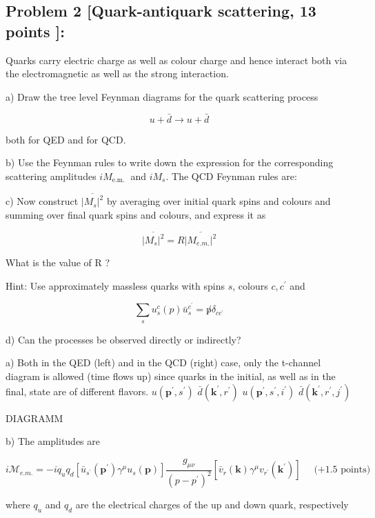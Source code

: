 \documentclass[10pt, letterpaper]{article}
\begin{document}
\subsection{Problem 2 [Quark-antiquark scattering, 13 points ]:}
Quarks carry electric charge as well as colour charge and hence interact both via the electromagnetic as well as the strong interaction.

a) Draw the tree level Feynman diagrams for the quark scattering process

$$
u+\bar{d} \rightarrow u+\bar{d}
$$

both for QED and for QCD.

b) Use the Feynman rules to write down the expression for the corresponding scattering amplitudes $i M_{\text {e.m. }}$ and $i M_s$. The QCD Feynman rules are:

c) Now construct $\overline{\left|M_s\right|^2}$ by averaging over initial quark spins and colours and summing over final quark spins and colours, and express it as

$$
\overline{\left|M_s\right|^2}=R \overline{\left|M_{e . m .}\right|^2}
$$

What is the value of R ?

Hint: Use approximately massless quarks with spins $s$, colours $c, c^{\prime}$ and

$$
\sum_s u_s^c(p) \bar{u}_s^{c^{\prime}}=\not p \delta_{c c^{\prime}}
$$

d) Can the processes be observed directly or indirectly?



a) Both in the QED (left) and in the QCD (right) case, only the t-channel diagram is allowed (time flows up) since quarks in the initial, as well as in the final, state are of different flavors.
$u\left(\mathbf{p}^{\prime}, s^{\prime}\right)$
$\bar{d}\left(\mathbf{k}^{\prime}, r^{\prime}\right)$
$u\left(\mathbf{p}^{\prime}, s^{\prime}, i^{\prime}\right)$
$\bar{d}\left(\mathbf{k}^{\prime}, r^{\prime}, j^{\prime}\right)$

DIAGRAMM

b) The amplitudes are

$$
i \mathcal{M}_{e . m .}=-i q_u q_d\left[\bar{u}_{s^{\prime}}\left(\mathbf{p}^{\prime}\right) \gamma^\mu u_s(\mathbf{p})\right] \frac{g_{\mu \nu}}{\left(p-p^{\prime}\right)^2}\left[\bar{v}_r(\mathbf{k}) \gamma^\mu v_{r^{\prime}}\left(\mathbf{k}^{\prime}\right)\right] \quad \text { (+1.5 points) }
$$

where $q_u$ and $q_d$ are the electrical charges of the up and down quark, respectively
\end{document}
